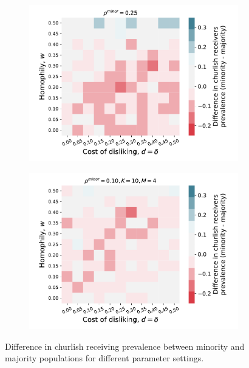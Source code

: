 \documentclass[11pt,letterpaper]{article}
\begin{document}
\begin{figure}[H]
\begin{subfigure}{0.48\textwidth}
  \end{subfigure} \\[.25in]
  \begin{subfigure}{0.48\textwidth}
    \centering
    \includegraphics[width=\textwidth]{Figures/churlish_receivers_diff_0p25.pdf}
  \end{subfigure}
  \hfill
  \begin{subfigure}{0.48\textwidth}
    \centering
    \includegraphics[width=\textwidth]{Figures/churlish_receivers_diff_0p10_K=10_M=4.pdf}
  \end{subfigure}
  \caption{Difference in churlish receiving prevalence between minority and majority
  populations for different parameter settings.}
\end{figure}
\end{document}
